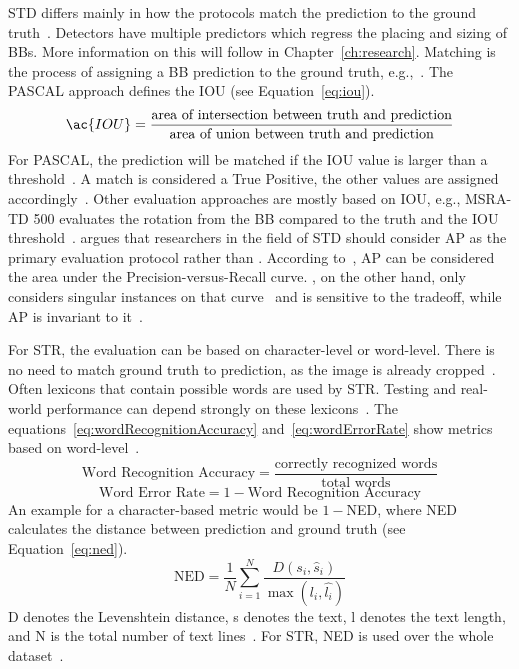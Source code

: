 \ac{STD} differs mainly in how the protocols match the prediction to the ground
truth~\citep{long_scene_2021}.
Detectors have multiple predictors which regress the placing and sizing of \acp{BB}.
More information on this will follow in Chapter~\ref{ch:research}.
Matching is the process of assigning a \ac{BB} prediction to the ground
truth, e.g.,~\cite{liu_ssd_2016,liao_textboxes_2018}.
The PASCAL approach defines the \ac{IOU} (see Equation~\ref{eq:iou}).
\begin{equation}\label{eq:iou}
    \ac{IOU}=
            \frac{\text{area of intersection between truth and prediction}}{\text{area of union
            between truth and prediction}}
\end{equation}
For PASCAL, the prediction will be matched if the \ac{IOU} value is larger than a
threshold~\citep{long_scene_2021}.
A match is considered a True Positive, the other values are assigned
accordingly~\citep{sun_icdar_2019}.
Other evaluation approaches are mostly based on \ac{IOU}, e.g., MSRA-TD 500 evaluates the rotation
from the \ac{BB} compared to the truth and the \ac{IOU}
threshold~\citep{long_scene_2021}.
\cite{long_scene_2021} argues that researchers in the field of \ac{STD} should consider \ac{AP}
as the primary evaluation protocol rather than \fone.
According to~\cite{su_relationship_2015}, \ac{AP} can be considered the area under the
Precision-versus-Recall curve.
\fone, on the other hand, only considers singular instances on that curve~\citep{long_scene_2021} and
is sensitive to the tradeoff, while \ac{AP} is invariant to it~\citep{shi_icdar2017_2017}.

For \ac{STR}, the evaluation can be based on character-level or word-level.
There is no need to match ground truth to prediction, as the image is already
cropped~\citep{long_scene_2021}.
Often lexicons that contain possible words are used by \ac{STR}.
Testing and real-world performance can depend strongly on these
lexicons~\citep{chen_text_2021,long_scene_2021}.
The equations~\ref{eq:wordRecognitionAccuracy} and~\ref{eq:wordErrorRate} show metrics based on
word-level~\citep{chen_text_2021}.
\begin{equation}\label{eq:wordRecognitionAccuracy}
\text{Word Recognition Accuracy} = \frac{\text{correctly recognized words}}{\text{total words}}
\end{equation}
\begin{equation}\label{eq:wordErrorRate}
    \text{Word Error Rate} = 1 - \text{Word Recognition Accuracy}
\end{equation}
An example for a character-based metric would be $1 - $NED, where \ac{NED}
calculates the distance between prediction and ground truth (see Equation~\ref{eq:ned}).
\begin{equation}\label{eq:ned}
    \text{NED} = \frac{1}{N}\sum_{i=1}^N \frac{D(s_i,\hat{s}_i)}{\max(l_i,\hat{l_i})}
\end{equation}
D denotes the Levenshtein distance, s denotes the text, l denotes the text length, and N is the total
number of text lines~\citep{shi_icdar2017_2017}.
For \ac{STR}, \ac{NED} is used over the whole dataset~\citep{karatzas_icdar_2013}.

